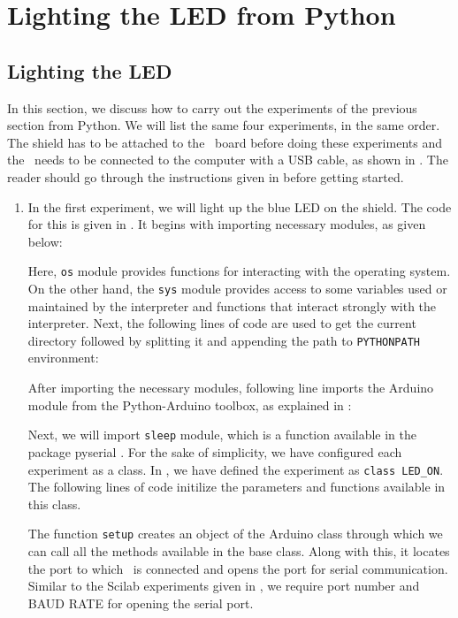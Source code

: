 \section{Lighting the LED from Python}
\subsection{Lighting the LED}
\label{sec:light-py}
In this section, we discuss how to carry out the experiments of the
previous section from Python.  We will list the same four experiments,
in the same order.  The shield has to be attached to the \arduino\ board
before doing these experiments and the \arduino\ needs to be connected to the computer 
with a USB cable, as shown in .
The reader should go through the instructions given in
 before getting started.
\begin{enumerate}
  \item In the first experiment, we will light up the blue LED on the
    shield.  The code for this is given in . It begins with importing 
    necessary modules, as given below: 
    

    Here, {\tt os} module provides functions for interacting with the operating system. On the 
    other hand, the {\tt sys} module provides access to some variables used or maintained by the interpreter
    and functions that interact strongly with the interpreter. Next, the following lines of code are used to get the current directory 
    followed by splitting it and appending the path to {\tt PYTHONPATH} environment: 
    
    
    After importing the necessary modules, following line imports the Arduino module from the Python-Arduino
    toolbox, as explained in :
    

    Next, we will import {\tt sleep} module, which is a function available in the package pyserial \cite{pySerial}.
    For the sake of simplicity, we have configured each experiment as a class. In ,
    we have defined the experiment as {\tt class LED\_ON}. The following lines of code 
    initilize the parameters and functions available in this class. 
    

    The function {\tt setup} creates an object of the Arduino class
    through which we can call all the methods available in the base class. 
    Along with this, it locates the port to which \arduino\ is connected 
    and opens the port for serial communication. Similar to the Scilab experiments 
    given in , we require port number and BAUD RATE for opening the serial port. 
        

\end{enumerate}
